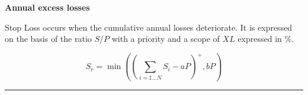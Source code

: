 \begin{f}
	
	
	
	



\textbf{Annual excess losses}
	
	
Stop Loss occurs when the cumulative annual losses deteriorate.
It is expressed on the basis of the ratio \(S/P\) with a priority and a scope of \(XL\) expressed in \%.
	
\[
S_r= \min\left( \left( \sum_{i=1\ldots N} S_i - a  P\right)^+,bP\right)  
\]

\end{f}
\hrule
	
